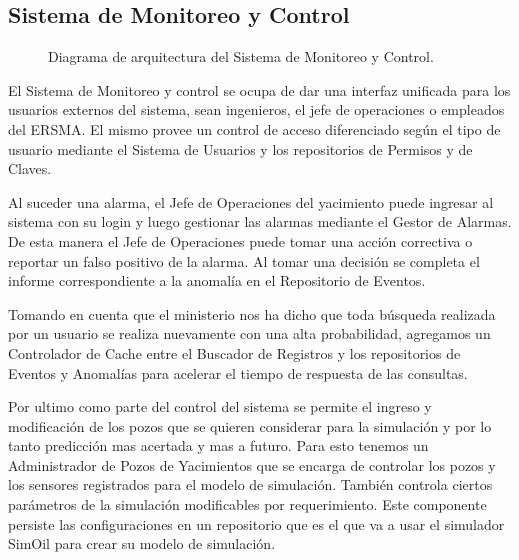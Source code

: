 \documentclass{article}
\theoremstyle{definition}
\theoremstyle{remark}
\begin{document}
\subsection{Sistema de Monitoreo y Control} \label{monitoreo_y_control}

\begin{figure}[H]
  \caption{Diagrama de arquitectura del Sistema de Monitoreo y Control.}
\end{figure}

El Sistema de Monitoreo y control se ocupa de dar una interfaz unificada para los usuarios externos del sistema, sean ingenieros, el jefe de operaciones o empleados del ERSMA. El mismo provee un control de acceso diferenciado según el tipo de usuario mediante el Sistema de Usuarios y los repositorios de Permisos y de Claves.

Al suceder una alarma, el Jefe de Operaciones del yacimiento puede ingresar al sistema con su login y luego gestionar las alarmas mediante el Gestor de Alarmas. De esta manera el Jefe de Operaciones puede tomar una acción correctiva o reportar un falso positivo de la alarma. Al tomar una decisión se completa el informe correspondiente a la anomalía en el Repositorio de Eventos.

Tomando en cuenta que el ministerio nos ha dicho que toda búsqueda realizada por un usuario se realiza nuevamente con una alta probabilidad, agregamos un Controlador de Cache entre el Buscador de Registros y los repositorios de Eventos y Anomalías para acelerar el tiempo de respuesta de las consultas.

Por ultimo como parte del control del sistema se permite el ingreso y modificación de los pozos que se quieren considerar para la simulación y por lo tanto predicción mas acertada y mas a futuro. Para esto tenemos un Administrador de Pozos de Yacimientos que se encarga de controlar los pozos y los sensores registrados para el modelo de simulación. También controla ciertos parámetros de la simulación modificables por requerimiento. Este componente persiste las configuraciones en un repositorio que es el que va a usar el simulador SimOil para crear su modelo de simulación.
\end{document}

